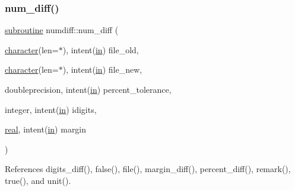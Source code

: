 \subsubsection{\texorpdfstring{num\+\_\+diff()}{num\_diff()}}
{\footnotesize\ttfamily \hyperlink{M__stopwatch_83_8txt_acfbcff50169d691ff02d4a123ed70482}{subroutine} numdiff\+::num\+\_\+diff (\begin{DoxyParamCaption}\item[{\hyperlink{option__stopwatch_83_8txt_abd4b21fbbd175834027b5224bfe97e66}{character}(len=$\ast$), intent(\hyperlink{M__journal_83_8txt_afce72651d1eed785a2132bee863b2f38}{in})}]{file\+\_\+old,  }\item[{\hyperlink{option__stopwatch_83_8txt_abd4b21fbbd175834027b5224bfe97e66}{character}(len=$\ast$), intent(\hyperlink{M__journal_83_8txt_afce72651d1eed785a2132bee863b2f38}{in})}]{file\+\_\+new,  }\item[{doubleprecision, intent(\hyperlink{M__journal_83_8txt_afce72651d1eed785a2132bee863b2f38}{in})}]{percent\+\_\+tolerance,  }\item[{integer, intent(\hyperlink{M__journal_83_8txt_afce72651d1eed785a2132bee863b2f38}{in})}]{idigits,  }\item[{\hyperlink{read__watch_83_8txt_abdb62bde002f38ef75f810d3a905a823}{real}, intent(\hyperlink{M__journal_83_8txt_afce72651d1eed785a2132bee863b2f38}{in})}]{margin }\end{DoxyParamCaption})}



References digits\+\_\+diff(), false(), file(), margin\+\_\+diff(), percent\+\_\+diff(), remark(), true(), and unit().

